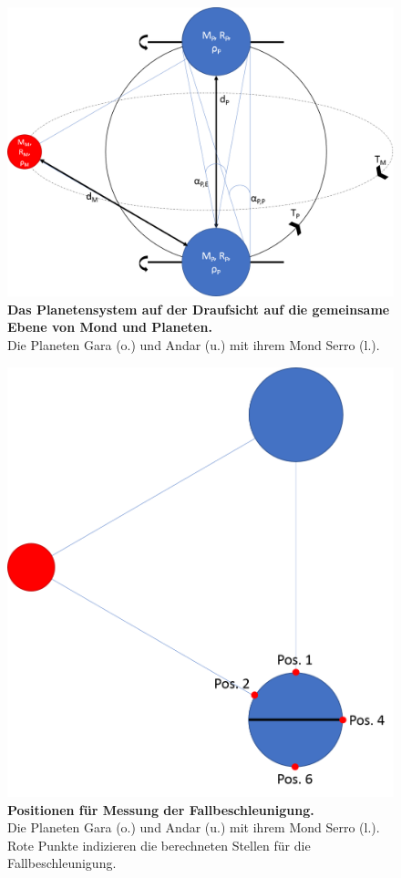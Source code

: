 \begin{figure}[tbh]
	\centering
	\includegraphics[width=0.9\linewidth]{Abbildungen/Weltenbau/Welt/planetensystem-nah}
	\caption[Planetensystem Skizzen 2]{\textbf{Das Planetensystem auf der Draufsicht auf die gemeinsame Ebene von Mond und Planeten.}\\
	Die Planeten Gara (o.) und Andar (u.) mit ihrem Mond Serro (l.).}
	\label{fig:planetensystem-fern}
\end{figure}

\begin{figure}[tbh]
	\centering
	\includegraphics[width=0.9\linewidth]{Abbildungen/Weltenbau/Welt/planetensystem-positionen}
	\caption[Planetensystem Skizzen 3]{\textbf{Positionen für Messung der Fallbeschleunigung.}\\
	Die Planeten Gara (o.) und Andar (u.) mit ihrem Mond Serro (l.). Rote Punkte indizieren die berechneten Stellen für die Fallbeschleunigung.}
	\label{fig:planetensystem-positionen}
\end{figure}


